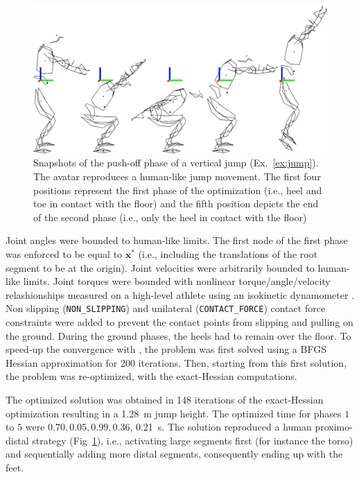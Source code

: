 \begin{figure}[t!]
\includegraphics[width=\columnwidth]{figures/kinogramme_jump}
\caption{Snapshots of the push-off phase of a vertical jump (Ex.~\ref{ex:jump}). The avatar reproduces a human-like jump movement. The first four positions represent the first phase of the optimization (i.e., heel and toe in contact with the floor) and the fifth position depicts the end of the second phase (i.e., only the heel in contact with the floor)} 
\label{fig:jump}
\end{figure}
Joint angles were bounded to human-like limits.
The first node of the first phase was enforced to be equal to $\mathbf{x^*}$ (i.e., including the translations of the root segment to be at the origin). 
Joint velocities were arbitrarily bounded to human-like limits.
Joint torques were bounded with nonlinear torque/angle/velocity relashionships measured on a high-level athlete using an isokinetic dynamometer \cite{jacksonMechanicsTableContact2010}. 
Non slipping (\texttt{NON\_SLIPPING}) and unilateral (\texttt{CONTACT\_FORCE}) contact force constraints were added to prevent the contact points from slipping and pulling on the ground.
During the ground phases, the heels had to remain over the floor.
To speed-up the convergence with \ipopt, the problem was first solved using a BFGS Hessian approximation for 200 iterations.
Then, starting from this first solution, the problem was re-optimized, with the exact-Hessian computations.

The optimized solution was obtained in 148 iterations of the exact-Hessian optimization resulting in a \SI{1.28}{\meter} jump height.
The optimized time for phases $1$ to $5$ were $0.70, 0.05, 0.99, 0.36$, \SI{0.21}{\second}.
The solution reproduced a human proximo-distal strategy (Fig~\ref{fig:jump}), i.e., activating large segments first (for instance the torso) and sequentially adding more distal segments, consequently ending up with the feet.
